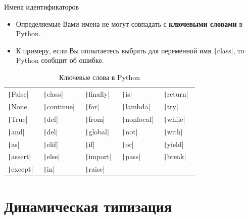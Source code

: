 \documentclass[aspectratio=169, mathserif]{beamer}	%
\begin{document}
\begin{frame}[fragile]{Имена идентификаторов}
\scriptsize
\begin{itemize}
	\item Определяемые Вами имена не могут совпадать с \textbf{ключевыми словами} в Python.
	\item К примеру, если Вы попытаетесь выбрать для переменной имя \texttt|class|, то Python сообщит об ошибке.
\end{itemize}
\begin{table}[h!]
\caption{Ключевые слова в Python}
\centering
\begin{tabular}{p{0.15\linewidth}p{0.15\linewidth}p{0.15\linewidth}p{0.15\linewidth}p{0.15\linewidth}}
	
	\hline
	\texttt|False| & 
	\texttt|class| & \texttt|finally| & \texttt|is| &
	\texttt|return| \\
	
	\texttt|None| & 
	\texttt|continue| & \texttt|for| & \texttt|lambda| &
	\texttt|try| \\
	
	\texttt|True| & 
	\texttt|def| &
	\texttt|from| &
	\texttt|nonlocal| &
	\texttt|while| \\
	
	\texttt|and| & \texttt|del| &
	\texttt|global| &
	\texttt|not| &
	\texttt|with| \\
	
	\texttt|as| & \texttt|elif| &
	\texttt|if| &
	\texttt|or| &
	\texttt|yield| \\
	
	\texttt|assert| & \texttt|else| &
	\texttt|import| &
	\texttt|pass| &
	\texttt|break| \\
	
	\texttt|except| & \texttt|in| &
	\texttt|raise| &
	&
	\\ 
	\hline
\end{tabular}
\end{table}
\vfill
\end{frame}

\section{Динамическая типизация}
\sectionframe
\end{document}
